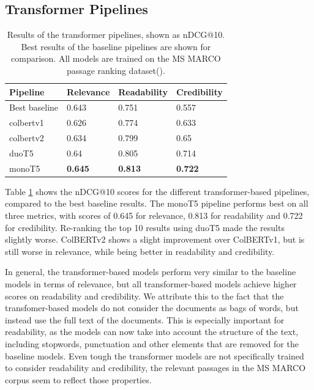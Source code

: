 \subsection{Transformer Pipelines}
\begin{table}[tb]
\centering
\begin{tabularx}{\textwidth}{lXXX}
\hline
Pipeline    & Relevance          & Readability        & Credibility        \\ \hline
Best baseline    & 0.643 & 0.751 & 0.557 \\
colbertv1      & 0.626 & 0.774 & 0.633 \\
colbertv2       & 0.634 & 0.799 & 0.65  \\
duoT5            & 0.64  & 0.805 & 0.714 \\
monoT5           & \textbf{0.645} & \textbf{0.813} & \textbf{0.722} \\
\hline
\end{tabularx}
\caption{Results of the transformer pipelines, shown as nDCG@10. Best results of the baseline pipelines are shown for comparison. All models are trained on the MS MARCO passage ranking dataset(\cite{bajaj:2016:MSMARCO}).}
\label{tab:transformer_pipelines}
\end{table}
Table \ref{tab:transformer_pipelines} shows the nDCG@10 scores for the different transformer-based pipelines, compared to the best baseline results.
The monoT5 pipeline performs best on all three metrics, with scores of 0.645 for relevance, 0.813 for readability and 0.722 for credibility.
Re-ranking the top 10 results using duoT5 made the results slightly worse.
ColBERTv2 shows a slight improvement over ColBERTv1, but is still worse in relevance, while being better in readability and credibility.

In general, the transformer-based models perform very similar to the baseline models in terms of relevance, but all transformer-based models achieve higher scores on readability and credibility.
We attribute this to the fact that the transfomer-based models do not consider the documents as bags of words, but instead use the full text of the documents.
This is especially important for readability, as the models can now take into account the structure of the text, including stopwords, punctuation and other elements that are removed for the baseline models.
Even tough the transformer models are not specifically trained to consider readability and credibility, the relevant passages in the MS MARCO corpus seem to reflect those properties.


